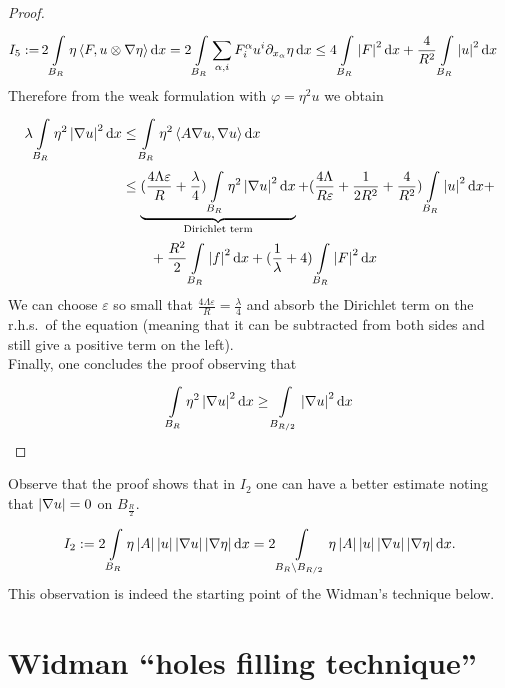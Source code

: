 \begin{proof}
\begin{align}
		I_{5}:= & \, 2 \int\limits_{B_{R}}^{} \eta \left\langle F, u \otimes \nabla \eta \right\rangle \dd{x} = 2 \int\limits_{B_{R}}^{} \sum_{\alpha,i} F_{i}^{\alpha} u^{i} \partial_{x_{\alpha}} \eta \dd{x}
		\leq 4 \int\limits_{B_{R}}^{} \abs{F}^{2} \dd{x} + \frac{4}{R^{2}} \int\limits_{B_{R}}^{} \abs{u}^{2} \dd{x}
	\end{align}
	Therefore from the weak formulation with \( \varphi = \eta^{2} u\) we obtain
	\begin{align}
		\lambda \int\limits_{B_{R}}^{} \eta^{2}\abs{\nabla u}^{2} \dd{x}
		 & \leq \int\limits_{B_{R}}^{} \eta^{2} \left\langle A \nabla u, \nabla u \right\rangle \dd{x}                                                                                                                                                                                \\
		 & \leq  \underbrace{(\frac{4 \Lambda \varepsilon}{R}+ \frac{\lambda}{4}) \int\limits_{B_{R}}^{} \eta^{2}\abs{\nabla u}^{2} \dd{x}}_{\text{Dirichlet term}} + (\frac{4 \Lambda}{R \varepsilon}+\frac{1}{2 R^{2}}+\frac{4}{R^{2}}) \int\limits_{B_{R}}^{} \abs{u}^{2} \dd{x} + \\
		 & \qquad + \frac{R^{2}}{2} \int\limits_{B_{R}}^{} \abs{f}^{2} \dd{x} + (\frac{1}{\lambda}+4) \int\limits_{B_{R}}^{} \abs{F}^{2} \dd{x}
	\end{align}
	We can choose \(\varepsilon \) so small that \(\frac{4 \Lambda \varepsilon}{R} = \frac{\lambda}{4}\) and absorb the Dirichlet term on the r.h.s.\ of the equation (meaning that it can be subtracted from both sides and still give a positive term on the left).\\
	Finally, one concludes the proof observing that
	\begin{gather}
		\int\limits_{B_{R}}^{} \eta^{2}\abs{\nabla u}^{2} \dd{x} \geq \int\limits_{B_{\frac{R}{2}}}^{} \abs{\nabla u}^{2} \dd{x}
	\end{gather}
\end{proof}
Observe that the proof shows that in \(I_{2}\) one can have a better estimate noting that \(\left\lvert\nabla u\right\rvert=0\) on \(B_{\frac{R}{2}}\).
\begin{gather}
	I_{2}:= 2 \int\limits_{B_{R}}^{} \eta \abs{A} \abs{u}\abs{\nabla u}\abs{\nabla \eta} \dd{x} = 2 \int\limits_{B_{R}\setminus B_{\frac{R}{2}}}^{} \eta \abs{A}\abs{u}\abs{\nabla u}\abs{\nabla \eta} \dd{x}.
\end{gather}
This observation is indeed the starting point of the Widman's technique below.

\section{Widman ``holes filling technique''}

